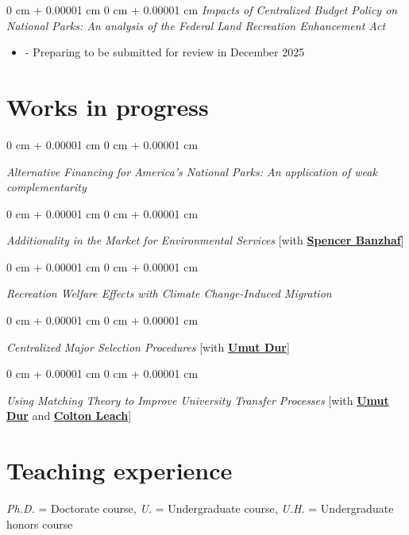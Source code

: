 \documentclass[11pt]{article}
\newenvironment{highlights}{
	\begin{itemize}[
		topsep=0.10 cm,
		parsep=0.10 cm,
		partopsep=0pt,
		itemsep=0pt,
		leftmargin=0 cm + 10pt
		]
	}{
	\end{itemize}
} %
\newenvironment{onecolentry}{
	\begin{adjustwidth}{
			0 cm + 0.00001 cm
		}{
			0 cm + 0.00001 cm
		}
	}{
	\end{adjustwidth}
} %
\begin{document}
\begin{onecolentry}%
	\textit{Impacts of Centralized Budget Policy on National Parks: An analysis of the Federal Land Recreation Enhancement Act}
	\vspace{-1ex}
	\begin{highlights}
		\item[-] Preparing to be submitted for review in December 2025
	\end{highlights}
\end{onecolentry}


\section{Works in progress}%

\begin{onecolentry}
	\textit{Alternative Financing for America's National Parks: An application of weak complementarity}
\end{onecolentry}

\begin{onecolentry}
	\textit{Additionality in the Market for Environmental Services}
	[with \href{https://spencerbanzhaf.wordpress.ncsu.edu/}{\textbf{Spencer Banzhaf}}]
\end{onecolentry}

\begin{onecolentry}
	\textit{Recreation Welfare Effects with Climate Change-Induced Migration}
\end{onecolentry}

\begin{onecolentry}
	\textit{Centralized Major Selection Procedures}
	[with \href{https://sites.google.com/site/umutdur/home}{\textbf{Umut Dur}}]
\end{onecolentry}

\begin{onecolentry}
	\textit{Using Matching Theory to Improve University Transfer Processes}
	[with \href{https://sites.google.com/site/umutdur/home}{\textbf{Umut Dur}} and \href{https://www.linkedin.com/in/colton-leach-54a080136}{\textbf{Colton Leach}}]
\end{onecolentry}

\section{Teaching experience}
 {\footnotesize \textit{Ph.D.} = Doctorate course, \textit{U.} = Undergraduate course, \textit{U.H.} = Undergraduate honors course}
\end{document}
